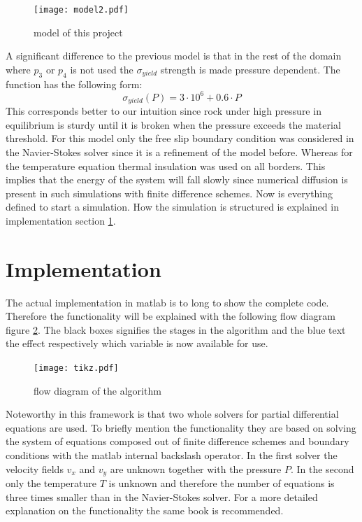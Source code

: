 \documentclass[12pt]{scrreprt}
\begin{document}
\begin{figure}[!ht]
\texttt{[image: model2.pdf]}
\label{fig:tm}
\caption{model of this project}
\end{figure}

A significant difference to the previous model is that in the rest of the domain where $p_3$ or $p_4$ is not used the $\sigma_{yield}$ strength is made pressure dependent. The function has the following form:
\begin{equation}
\sigma_{yield}(P) = 3\cdot 10^6+0.6 \cdot P
\end{equation}
This corresponds better to our intuition since rock under high pressure in equilibrium is sturdy until it is broken when the pressure exceeds the material threshold. For this model only the free slip boundary condition was considered in the Navier-Stokes solver since it is a refinement of the model before. Whereas for the temperature equation thermal insulation was used on all borders. This implies that the energy of the system will fall slowly since numerical diffusion is present in such simulations with finite difference schemes. Now is everything defined to start a simulation. How the simulation is structured is explained in implementation section \ref{seq:impl}.  


\section{Implementation}
\label{seq:impl}
The actual implementation in matlab is to long to show the complete code. Therefore the functionality will be explained with the following flow diagram figure \ref{fig:flow}. The black boxes signifies the stages in the algorithm and the blue text the effect respectively which variable is now available for use.

\begin{figure}[!ht]
\texttt{[image: tikz.pdf]}
\caption{flow diagram of the algorithm}
\label{fig:flow}
\end{figure}

Noteworthy in this framework is that two whole solvers for partial differential equations are used. To briefly mention the functionality they are based on solving the system of equations composed out of finite difference schemes and boundary conditions with the matlab internal backslash operator. In the first solver the velocity fields $v_x$ and $v_y$ are unknown together with the pressure $P$. In the second only the temperature $T$ is unknown and therefore the number of equations is three times smaller than in the Navier-Stokes solver. For a more detailed explanation on the functionality the same book \cite{gerya2009introduction} is recommended.
\end{document}
